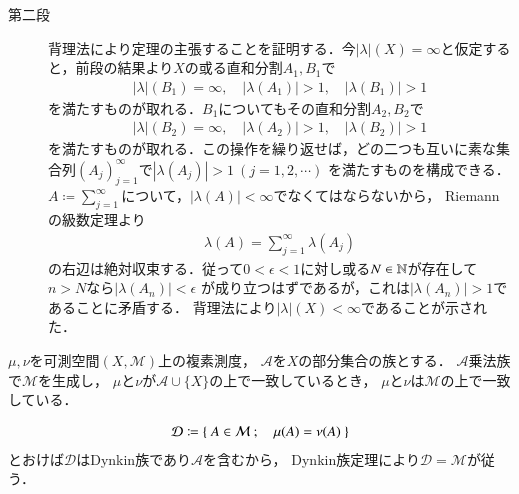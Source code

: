 \begin{prf}
\begin{description}
		\item[第二段]
			背理法により定理の主張することを証明する．今$|\lambda|(X) = \infty$と仮定すると，前段の結果より$X$の或る直和分割$A_1,B_1$で
			\begin{align}
				|\lambda|(B_1) = \infty, \quad |\lambda(A_1)| > 1, \quad |\lambda(B_1)| > 1
			\end{align}
			を満たすものが取れる．$B_1$についてもその直和分割$A_2,B_2$で
			\begin{align}
				|\lambda|(B_2) = \infty, \quad |\lambda(A_2)| > 1, \quad |\lambda(B_2)| > 1
			\end{align}
			を満たすものが取れる．この操作を繰り返せば，どの二つも互いに素な集合列$(A_j)_{j=1}^{\infty}$で$|\lambda(A_j)| > 1\ (j=1,2,\cdots)$
			を満たすものを構成できる．$A \coloneqq \sum_{j=1}^{\infty}$について，$|\lambda(A)| < \infty$でなくてはならないから，
			Riemannの級数定理より
			\begin{align}
				\lambda(A) = \sum_{j=1}^{\infty} \lambda(A_j)
			\end{align}
			の右辺は絶対収束する．従って$0 < \epsilon < 1$に対し或る$N \in \mathbb{N}$が存在して$n > N$なら$|\lambda(A_n)| < \epsilon$
			が成り立つはずであるが，これは$|\lambda(A_n)| > 1$であることに矛盾する．
			背理法により$|\lambda|(X) < \infty$であることが示された．
		\end{description}
		\QED
	\end{prf}
	
	\begin{screen}
		\begin{thm}[複素測度の一致の定理]
			$\mu,\nu$を可測空間$(X,\mathcal{M})$上の複素測度，
			$\mathscr{A}$を$X$の部分集合の族とする．
			$\mathscr{A}$乗法族で$\mathcal{M}$を生成し，
			$\mu$と$\nu$が$\mathscr{A} \cup \{X\}$の上で一致しているとき，
			$\mu$と$\nu$は$\mathcal{M}$の上で一致している．
			\label{thm:identity_theorem_of_complex_measures}
		\end{thm}
	\end{screen}
	
	\begin{prf}
		\begin{align}
			\mathcal{D} \coloneqq
			\left\{\ A \in \mathcal{M}\ ;\quad \mu(A) = \nu(A)\ \right\}
		\end{align}
		とおけば$\mathcal{D}$はDynkin族であり$\mathscr{A}$を含むから，
		Dynkin族定理により$\mathcal{D} = \mathcal{M}$が従う．
		\QED
	\end{prf}
	
